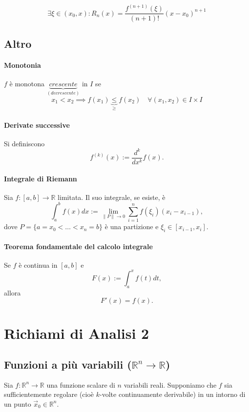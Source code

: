 \documentclass[12pt,a4paper]{article}
\begin{document}
\[
\exists \xi \in (x_0, x) : R_n(x) = \frac{f^{(n+1)}(\xi)}{(n+1)!} (x - x_0)^{n+1}
\]

\subsection*{Altro}
\paragraph{Monotonia}
\( f \) è monotona $\underbrace{crescente}_{(decrescente)}$ in \( I \) se
\[
x_1 < x_2 \implies f(x_1) \underbrace{\leq}_{\geq} f(x_2) \quad\forall (x_1,x_2) \in I\times I
\]

\paragraph{Derivate successive}
Si definiscono
\[
f^{(k)}(x) := \frac{d^k}{dx^k} f(x).
\]

\paragraph{Integrale di Riemann}
Sia \( f : [a,b] \to \mathbb{R} \) limitata.  
Il suo integrale, se esiste, è
\[
\int_a^b f(x) dx := \lim_{\|P\| \to 0} \sum_{i=1}^n f(\xi_i)(x_i - x_{i-1}),
\]
dove \( P = \{a = x_0 < \dots < x_n = b\} \) è una partizione e \( \xi_i \in [x_{i-1}, x_i] \).

\paragraph{Teorema fondamentale del calcolo integrale}
Se \( f \) è continua in \([a,b]\) e
\[
F(x) := \int_a^x f(t) dt,
\]
allora
\[
F'(x) = f(x).
\]





\newpage
\section*{Richiami di Analisi 2}
\subsection*{Funzioni a più variabili (\( \mathbb{R}^n \to \mathbb{R} \))}

Sia \( f : \mathbb{R}^n \to \mathbb{R} \) una funzione scalare di \( n \) variabili reali. Supponiamo che \( f \) sia sufficientemente regolare (cioè \( k \)-volte continuamente derivabile) in un intorno di un punto \( \vec{x}_0 \in \mathbb{R}^n \).
\end{document}
